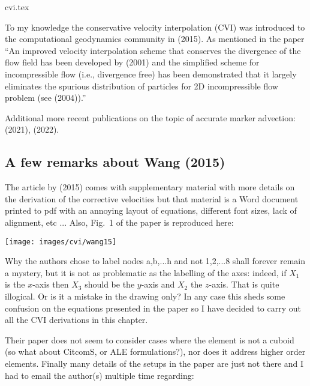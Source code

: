 \begin{flushright} {\tiny {\color{gray} cvi.tex}} \end{flushright}


To my knowledge the conservative velocity interpolation (CVI) was introduced to 
the computational geodynamics community in \textcite{waav15} (2015). 
As mentioned in the paper  ``An improved velocity interpolation scheme that conserves the divergence 
of the flow field has been developed by \textcite{jepm01} (2001) and the simplified scheme for incompressible 
flow (i.e., divergence free) has been demonstrated that it largely eliminates the spurious 
distribution of particles for 2D incompressible flow problem (see \textcite{meje04} (2004)).''

Additional more recent publications on the topic of accurate marker 
advection: \textcite{simw21} (2021), \textcite{siwv22} (2022).

\subsection{A few remarks about Wang \etal (2015)}

The article by \textcite{waav15} (2015) comes with supplementary material with more details 
on the derivation of the corrective velocities but that material is a Word
document printed to pdf with an annoying layout of equations, different font sizes,
lack of alignment, etc ... Also, Fig.~1 of the paper is reproduced here:
\begin{center}
\texttt{[image: images/cvi/wang15]}
\end{center}
Why the authors chose to label nodes a,b,...h and not 1,2,...8 shall forever remain 
a mystery, but it is not as problematic as the labelling of the axes:
indeed, if $X_1$ is the $x$-axis then $X_3$ should be the $y$-axis 
and $X_2$ the $z$-axis. That is quite illogical. Or is it a mistake in 
the drawing only? In any case this sheds some confusion on the equations 
presented in the paper so I have decided to carry out all the CVI derivations 
in this chapter.

Their paper does not seem to consider cases where the element is not a 
cuboid (so what about CitcomS, or ALE formulations?), nor does it address higher order elements. 
Finally many details of the setups in the paper are just not there and I had to 
email the author(s) multiple time regarding:

